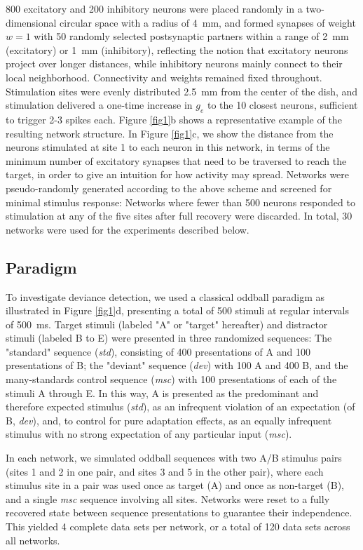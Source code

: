 \documentclass[pdflatex,referee,iicol,sn-basic]{sn-jnl}
\newcommand{\dev}{\textit{dev}}
\newcommand{\msc}{\textit{msc}}
\newcommand{\std}{\textit{std}}
\theoremstyle{thmstyleone}%
\theoremstyle{thmstyletwo}%
\theoremstyle{thmstylethree}%
\begin{document}
800 excitatory and 200 inhibitory neurons were placed randomly in a two-dimensional circular space with a radius of 4~mm, and formed synapses of weight $w = 1$ with 50 randomly selected postsynaptic partners within a range of 2~mm (excitatory) or 1~mm (inhibitory), reflecting the notion that excitatory neurons project over longer distances, while inhibitory neurons mainly connect to their local neighborhood. Connectivity and weights remained fixed throughout. Stimulation sites were evenly distributed 2.5~mm from the center of the dish, and stimulation delivered a one-time increase in $g_e$ to the 10 closest neurons, sufficient to trigger 2-3 spikes each. Figure \ref{fig1}b shows a representative example of the resulting network structure. In Figure \ref{fig1}c, we show the distance from the neurons stimulated at site 1 to each neuron in this network, in terms of the minimum number of excitatory synapses that need to be traversed to reach the target, in order to give an intuition for how activity may spread. Networks were pseudo-randomly generated according to the above scheme and screened for minimal stimulus response: Networks where fewer than 500 neurons responded to stimulation at any of the five sites after full recovery were discarded. In total, 30 networks were used for the experiments described below.

\subsection{Paradigm}\label{sec-paradigm}

To investigate deviance detection, we used a classical oddball paradigm as illustrated in Figure \ref{fig1}d, presenting a total of 500 stimuli at regular intervals of 500~ms. Target stimuli (labeled "A" or "target" hereafter) and distractor stimuli (labeled B to E) were presented in three randomized sequences: The "standard" sequence (\std{}), consisting of 400 presentations of A and 100 presentations of B; the "deviant" sequence (\dev{}) with 100 A and 400 B, and the many-standards control sequence (\msc{}) with 100 presentations of each of the stimuli A through E. In this way, A is presented as the predominant and therefore expected stimulus (\std{}), as an infrequent violation of an expectation (of B, \dev{}), and, to control for pure adaptation effects, as an equally infrequent stimulus with no strong expectation of any particular input (\msc{}).

In each network, we simulated oddball sequences with two A/B stimulus pairs (sites 1 and 2 in one pair, and sites 3 and 5 in the other pair), where each stimulus site in a pair was used once as target (A) and once as non-target (B), and a single \msc{} sequence involving all sites. Networks were reset to a fully recovered state between sequence presentations to guarantee their independence. This yielded 4 complete data sets per network, or a total of 120 data sets across all networks.
\end{document}
